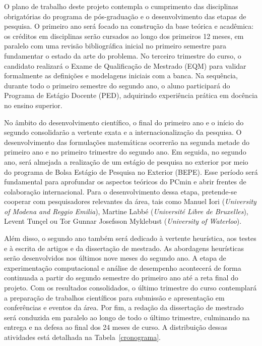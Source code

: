 O plano de trabalho deste projeto contempla o cumprimento das disciplinas obrigatórias do programa de pós-graduação e o desenvolvimento das etapas de pesquisa. O primeiro ano será focado na construção da base teórica e acadêmica: os créditos em disciplinas serão cursados ao longo dos primeiros 12 meses, em paralelo com uma revisão bibliográfica inicial no primeiro semestre para fundamentar o estado da arte do problema. No terceiro trimestre do curso, o candidato realizará o Exame de Qualificação de Mestrado (EQM) para validar formalmente as definições e modelagens iniciais com a banca. Na sequência, durante todo o primeiro semestre do segundo ano, o aluno participará do Programa de Estágio Docente (PED), adquirindo experiência prática em docência no ensino superior.

No âmbito do desenvolvimento científico, o final do primeiro ano e o início do segundo consolidarão a vertente exata e a internacionalização da pesquisa. O desenvolvimento das formulações matemáticas ocorrerão na segunda metade do primeiro ano e no primeiro trimestre do segundo ano. Em seguida, no segundo ano, será almejada a realização de um estágio de pesquisa no exterior por meio do programa de Bolsa Estágio de Pesquisa no Exterior (BEPE). Esse período será fundamental para aprofundar os aspectos teóricos do PCmin e abrir frentes de colaboração internacional. Para o desenvolvimento dessa etapa, pretende-se cooperar com pesquisadores relevantes da área, tais como Manuel Iori (\emph{University of Modena and Reggio Emilia}), Martine Labbé (\emph{Université Libre de Bruxelles}), Levent Tunçel ou Tor Gunnar Josefsson Myklebust (\emph{University of Waterloo}).

Além disso, o segundo ano também será dedicado à vertente heurística, aos testes e à escrita de artigos e da dissertação de mestrado. As abordagens heurísticas serão desenvolvidos nos últimos nove meses do segundo ano. A etapa de experimentação computacional e análise de desempenho acontecerá de forma continuada a partir do segundo semestre do primeiro ano até a reta final do projeto. Com os resultados consolidados, o último trimestre do curso contemplará a preparação de trabalhos científicos para submissão e apresentação em conferências e eventos da área. Por fim, a redação da dissertação de mestrado será conduzida em paralelo ao longo de todo o último trimestre, culminando na entrega e na defesa ao final dos 24 meses de curso. A distribuição dessas atividades está detalhada na Tabela~\ref{cronograma}.


